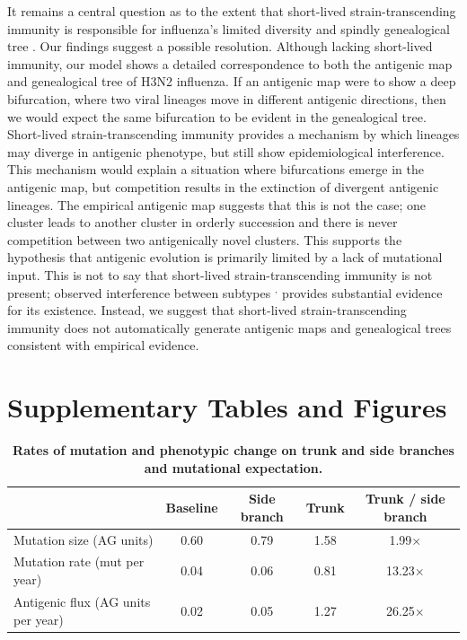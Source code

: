 It remains a central question as to the extent that short-lived strain-transcending immunity is responsible for influenza's limited diversity and spindly genealogical tree \cite{Ferguson03,Tria05}.  Our findings suggest a possible resolution.  Although lacking short-lived immunity, our model shows a detailed correspondence to both the antigenic map and genealogical tree of H3N2 influenza.  If an antigenic map were to show a deep bifurcation, where two viral lineages move in different antigenic directions, then we would expect the same bifurcation to be evident in the genealogical tree.  Short-lived strain-transcending immunity provides a mechanism by which lineages may diverge in antigenic phenotype, but still show epidemiological interference.  This mechanism would explain a situation where bifurcations emerge in the antigenic map, but competition results in the extinction of divergent antigenic lineages.  The empirical antigenic map \cite{Smith04} suggests that this is not the case; one cluster leads to another cluster in orderly succession and there is never competition between two antigenically novel clusters.  This supports the hypothesis that antigenic evolution is primarily limited by a lack of mutational input.  This is not to say that short-lived strain-transcending immunity is not present; observed interference between subtypes \cite{Ferguson03}$^,$  provides substantial evidence for its existence.  Instead, we suggest that short-lived strain-transcending immunity does not automatically generate antigenic maps and genealogical trees consistent with empirical evidence.


\vspace{1cm}

\pagebreak

\section*{Supplementary Tables and Figures}

\begin{table}[h]
	\centering
	\caption{\textbf{Rates of mutation and phenotypic change on trunk and side branches and mutational expectation.}}
	\label{mktable}
	\begin{tabular}{ l c c c c } 
	\hline
		 								& Baseline 	& Side branch 	& Trunk		& Trunk / side branch \\
	\hline				
	Mutation size (AG units)			& 0.60		& 0.79			& 1.58		& 1.99$\times$ \\
	Mutation rate (mut per year)		& 0.04		& 0.06			& 0.81		& 13.23$\times$ \\	
	Antigenic flux (AG units per year)	& 0.02		& 0.05			& 1.27		& 26.25$\times$ \\		
	\hline
	\end{tabular}
\end{table}

